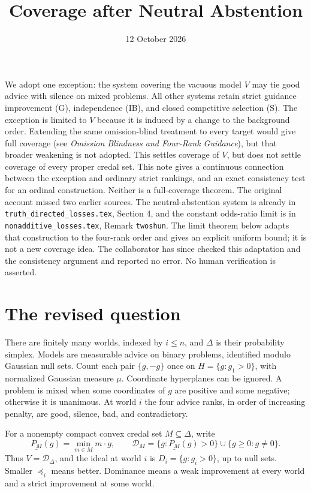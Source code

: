 \documentclass[11pt]{article}
\title{Coverage after Neutral Abstention}
\author{}\date{12 October 2026}
\theoremstyle{remark}\newtheorem{remark}[theorem]{Remark}
\newcommand{\Dscr}{\mathcal D}
\begin{document}
\maketitle

\noindent
We adopt one exception: the system covering the vacuous model $V$ may
tie good advice with silence on mixed problems. All other systems retain
strict guidance improvement (G), independence (IB), and closed competitive
selection (S). The exception is limited to $V$ because it is induced by
a change to the background order. Extending the same omission-blind
treatment to every target would give full coverage (see \emph{Omission
Blindness and Four-Rank Guidance}), but that broader weakening is not
adopted. This settles coverage of $V$, but does not settle coverage
of every proper credal set. This note gives a continuous connection between
the exception and ordinary strict rankings, and an exact consistency test
for an ordinal construction. Neither is a full-coverage theorem.
The original account missed two earlier sources. The neutral-abstention
system is already in \texttt{truth\_directed\_losses.tex}, Section 4,
and the constant odds-ratio limit is in \texttt{nonadditive\_losses.tex},
Remark \texttt{twoshun}. The limit theorem below adapts that construction
to the four-rank order and gives an explicit uniform bound; it is not a
new coverage idea. The collaborator has since checked this adaptation and
the consistency argument and reported no error. No human verification
is asserted.

\section{The revised question}

There are finitely many worlds, indexed by $i\le n$, and $\Delta$ is their
probability simplex. Models are measurable advice on binary problems,
identified modulo Gaussian null sets. Count each pair $\{g,-g\}$ once on
$H=\{g:g_1>0\}$, with normalized Gaussian measure $\mu$. Coordinate
hyperplanes can be ignored. A problem is mixed when some coordinates of
$g$ are positive and some negative; otherwise it is unanimous.
At world $i$ the four advice ranks, in order of increasing penalty, are
good, silence, bad, and contradictory.

For a nonempty compact convex credal set $M\subseteq\Delta$, write
\[
 \underline{P_M}(g)=\min_{m\in M}m\cdot g,\qquad
 \Dscr_M=\{g:\underline{P_M}(g)>0\}\cup\{g\ge0:g\ne0\}.
\]
Thus $V=\Dscr_\Delta$, and the ideal at world $i$ is $D_i=\{g:g_i>0\}$,
up to null sets. Smaller $\preceq_i$ means better. Dominance means a weak
improvement at every world and a strict improvement at some world.
\end{document}
